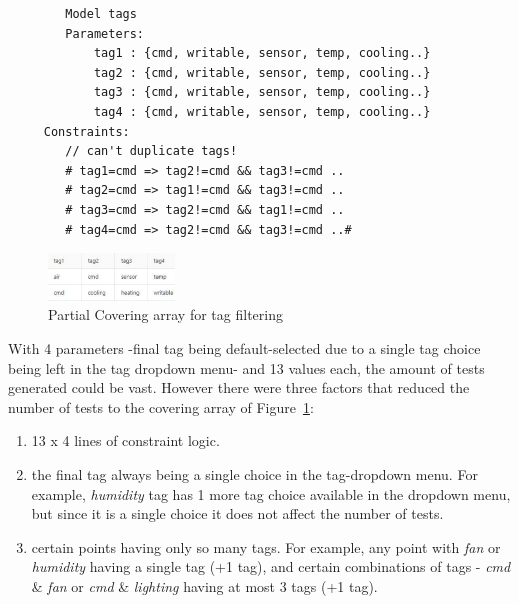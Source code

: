 \documentclass[conference]{IEEEtran}
\begin{document}
	\begin{lstlisting}
		Model tags
		Parameters:
			tag1 : {cmd, writable, sensor, temp, cooling..}
			tag2 : {cmd, writable, sensor, temp, cooling..}
			tag3 : {cmd, writable, sensor, temp, cooling..}
			tag4 : {cmd, writable, sensor, temp, cooling..}
	 Constraints:
		// can't duplicate tags!
		# tag1=cmd => tag2!=cmd && tag3!=cmd ..
		# tag2=cmd => tag1!=cmd && tag3!=cmd ..
		# tag3=cmd => tag2!=cmd && tag1!=cmd ..
		# tag4=cmd => tag2!=cmd && tag3!=cmd ..#
	\end{lstlisting}

	\begin{figure}[!t]
		\centering
		\includegraphics[width=0.30\textwidth,]{tagFilterCoveringArray.pdf}
		\caption{Partial Covering array for tag filtering}
		\label{fig:tagFilterCoveringArray}
	\end{figure}

	With 4 parameters -final tag being default-selected due to a single tag choice being left in the tag dropdown menu- and 13 values each, the amount of tests generated could be vast. 
	However there were three factors that reduced the number of tests to the covering array of Figure~\ref{fig:tagFilterCoveringArray}:
	
	\begin{enumerate}
		\item 13 x 4 lines of constraint logic.
		\item the final tag always being a single choice in the tag-dropdown menu. For example, \textit{humidity} tag has 1 more tag choice available in the dropdown menu, but since it is a single choice it does not affect  the number of tests.
		\item certain points having only so many tags. For example, any point with \textit{fan} or \textit{humidity} having a single tag (+1 tag), and certain combinations of tags - \textit{cmd} \& \textit{fan} or \textit{cmd} \& \textit{lighting} having at most 3 tags (+1 tag).
	\end{enumerate}
\end{document}

